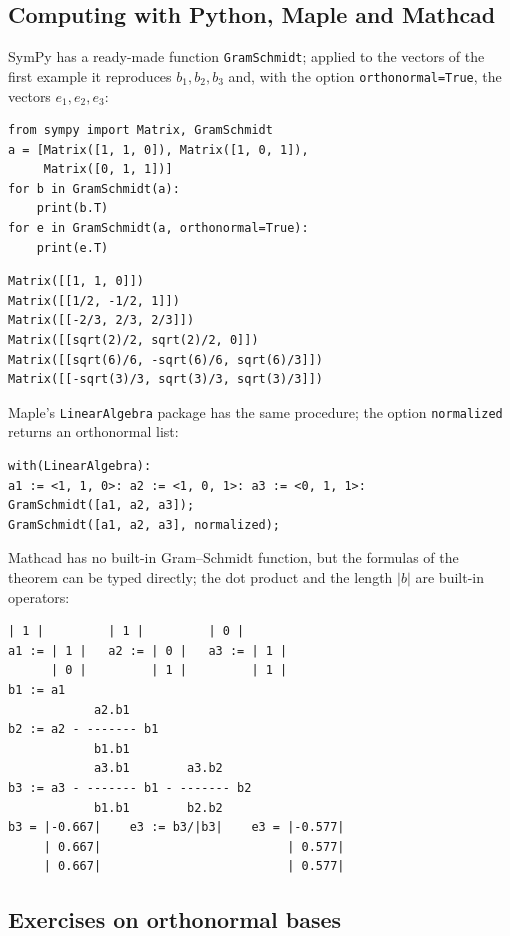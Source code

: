 \subsection{Computing with Python, Maple and Mathcad}

SymPy has a ready-made function \texttt{GramSchmidt}; applied to the vectors of
the first example it reproduces $b_1,b_2,b_3$ and, with the option
\texttt{orthonormal=True}, the vectors $e_1,e_2,e_3$:
\begin{Verbatim}[fontsize=\footnotesize,frame=single,label={\small Python}]
from sympy import Matrix, GramSchmidt
a = [Matrix([1, 1, 0]), Matrix([1, 0, 1]),
     Matrix([0, 1, 1])]
for b in GramSchmidt(a):
    print(b.T)
for e in GramSchmidt(a, orthonormal=True):
    print(e.T)
\end{Verbatim}
\begin{Verbatim}[fontsize=\footnotesize,frame=single,label={\small Output}]
Matrix([[1, 1, 0]])
Matrix([[1/2, -1/2, 1]])
Matrix([[-2/3, 2/3, 2/3]])
Matrix([[sqrt(2)/2, sqrt(2)/2, 0]])
Matrix([[sqrt(6)/6, -sqrt(6)/6, sqrt(6)/3]])
Matrix([[-sqrt(3)/3, sqrt(3)/3, sqrt(3)/3]])
\end{Verbatim}
Maple’s \texttt{LinearAlgebra} package has the same procedure; the option
\texttt{normalized} returns an orthonormal list:
\begin{Verbatim}[fontsize=\footnotesize,frame=single,label={\small Maple}]
with(LinearAlgebra):
a1 := <1, 1, 0>: a2 := <1, 0, 1>: a3 := <0, 1, 1>:
GramSchmidt([a1, a2, a3]);
GramSchmidt([a1, a2, a3], normalized);
\end{Verbatim}
Mathcad has no built-in Gram–Schmidt function, but the formulas of the theorem
can be typed directly; the dot product and the length $|b|$ are built-in operators:
\begin{Verbatim}[fontsize=\footnotesize,frame=single,label={\small Mathcad}]
      | 1 |         | 1 |         | 0 |
a1 := | 1 |   a2 := | 0 |   a3 := | 1 |
      | 0 |         | 1 |         | 1 |
b1 := a1
            a2.b1
b2 := a2 - ------- b1
            b1.b1
            a3.b1        a3.b2
b3 := a3 - ------- b1 - ------- b2
            b1.b1        b2.b2
b3 = |-0.667|    e3 := b3/|b3|    e3 = |-0.577|
     | 0.667|                          | 0.577|
     | 0.667|                          | 0.577|
\end{Verbatim}

\subsection{Exercises on orthonormal bases}

